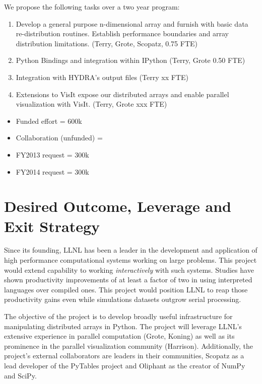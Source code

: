 \documentclass[letterpaper,11pt]{article}
\begin{document}
We propose the following tasks over a two year program:

\begin{enumerate}
	\item Develop a general purpose n-dimensional array and furnish with basic data 
		re-distribution routines.  Establish performance boundaries and array distribution 
		limitations. (Terry, Grote, Scopatz, 0.75 FTE) 

	\item Python Bindings and integration within IPython (Terry, Grote 0.50 FTE)

	\item Integration with HYDRA's output files (Terry xx FTE)

	\item Extensions to VisIt expose our distributed arrays and enable parallel visualization 
		with VisIt. (Terry, Grote xxx FTE)

\end{enumerate}

\begin{itemize}
	\setlength{\itemsep}{0pt}
	\setlength{\parskip}{0pt}
	\setlength{\parsep}{0pt}

	\item Funded effort = 600k
	\item Collaboration (unfunded) =
	\item FY2013 request =  300k
	\item FY2014 request =  300k
\end{itemize}


\section*{Desired Outcome, Leverage and Exit Strategy}

Since its founding, LLNL has been a leader in the development and application of high 
performance computational systems working on large problems.  This project would extend 
capability to working \emph{interactively} with such systems.  Studies have shown productivity 
improvements of at least a factor of two\cite{Prechelt2000} in using interpreted languages 
over compiled ones.  This project would position LLNL to reap those productivity gains even 
while simulations datasets outgrow serial processing.

The objective of the project is to develop broadly useful infrastructure for manipulating 
distributed arrays in Python.  The project will leverage LLNL's extensive experience in 
parallel computation (Grote, Koning) as well as its prominence in the parallel visualization 
community (Harrison).  Additionally, the project's external collaborators are leaders in their 
communities, Scopatz as a lead developer of the PyTables project and Oliphant as the creator of 
NumPy and SciPy.
\end{document}
